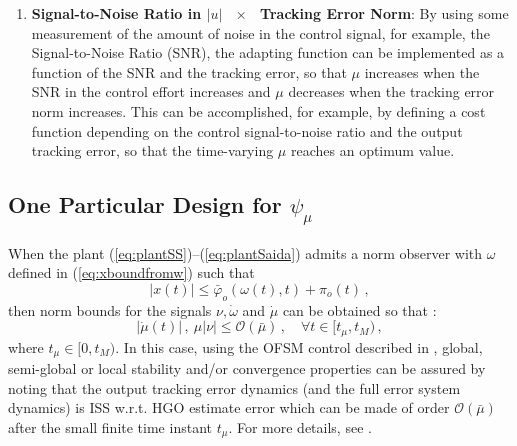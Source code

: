 \documentclass[letterpaper, 10 pt, conference]{ieeeconf}  %
\theoremstyle{plain}
\theoremstyle{definition}
\theoremstyle{remark}
\begin{document}
\begin{enumerate}
\begin{enumerate}
\item {\bf Signal-to-Noise Ratio in $|u|$ \  $\times$ \ Tracking Error Norm}: By using some measurement of the amount of noise in the control signal, for example, the Signal-to-Noise Ratio (SNR), the adapting function can be implemented as a function of the SNR and the tracking error, so that $\mu$ increases when the SNR in the control effort increases and $\mu$ decreases when the tracking error norm increases. This can be accomplished, for example, by defining a cost function depending on the control signal-to-noise ratio and the output tracking error, so that the time-varying $\mu$ reaches an optimum value.
\end{enumerate}

 
\end{enumerate}



\subsection{One Particular Design for $\psi_\mu$}

When the plant (\ref{eq:plantSS})--(\ref{eq:plantSaida}) admits a norm observer with $\omega$ defined in (\ref{eq:xboundfromw}) such that 
%
\begin{equation}
|x(t)| \leq \bar{\varphi}_o(\omega(t),t) + \pi_o(t)\,,\label{eq:xboundfromw1}
\end{equation}
%
then norm bounds for the signals $\nu, \dot{\omega}$ and $\dot{\mu}$ can be obtained so that \cite{POH:2011}:
%
\begin{equation}
|\dot{\mu}(t)|\,, \ \mu |\nu| \leq \mathcal{O}(\bar{\mu})\,, \quad
\forall t \in [t_\mu,t_M)\,, \label{eq:mudotmunu1}
\end{equation}
%
where $t_\mu \in [0,t_M)$. In this case, using the OFSM control described in \cite{POH:2011}, global, semi-global or local stability and/or convergence properties can be assured by noting that the output tracking error dynamics (and the full error system dynamics) is ISS w.r.t. HGO estimate error  which can be made of order $\mathcal{O}(\bar{\mu})$ after the small finite time instant $t_\mu$. For more details, see \cite{POH:2011}.
\end{document}
